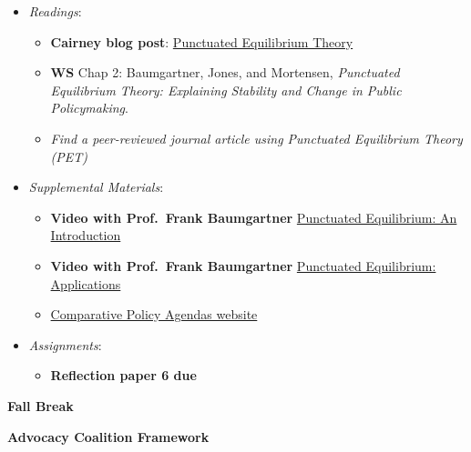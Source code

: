 \begin{itemize}

\item
  \emph{Readings}:

  \begin{itemize}
  
  \item
    \textbf{Cairney blog post}:
    \href{https://paulcairney.wordpress.com/2013/10/29/policy-concepts-in-1000-words-punctuated-equilibrium-theory/}{Punctuated
    Equilibrium Theory}
  \item
    \textbf{WS} Chap 2: Baumgartner, Jones, and Mortensen,
    \emph{Punctuated Equilibrium Theory: Explaining Stability and Change
    in Public Policymaking}.
  \item
    \emph{Find a peer-reviewed journal article using Punctuated
    Equilibrium Theory (PET)}
  \end{itemize}
\item
  \emph{Supplemental Materials}:

  \begin{itemize}
  
  \item
    \faYoutube \hspace{0.005in} \textbf{Video with Prof.~Frank
    Baumgartner}
    \href{https://www.youtube.com/watch?v=jX2ecS7ri2I}{Punctuated
    Equilibrium: An Introduction}
  \item
    \faYoutube \hspace{0.005in} \textbf{Video with Prof.~Frank
    Baumgartner}
    \href{https://www.youtube.com/watch?v=jX2ecS7ri2I}{Punctuated
    Equilibrium: Applications}
  \item
    \href{https://www.comparativeagendas.net/}{Comparative Policy
    Agendas website}
  \end{itemize}
\item
  \emph{Assignments}:

  \begin{itemize}
  
  \item
    \textbf{Reflection paper 6 due}
  \end{itemize}
\end{itemize}

\week \textbf{Fall Break}

\week \textbf{Advocacy Coalition Framework}


